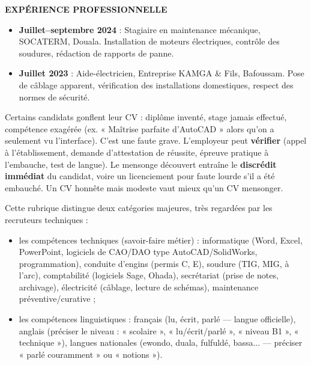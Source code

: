 \documentclass[11pt]{article}
\newcommand{\cle}[1]{{\popxbold\color{popdark}#1}}
\newcounter{popsec}
\newcounter{popsub}
\newcommand{\courssub}[1]{%
  \stepcounter{popsub}%
  \par\vspace{9pt}\noindent{\popxbold\fontsize{11.5}{13}\selectfont\color{popink}{\color{poporange}\thepopsec.\thepopsub}\hspace{6pt}#1}\par\nopagebreak\vspace{4pt}
}
\begin{document}
\begin{exemplebox}
\textbf{EXPÉRIENCE PROFESSIONNELLE}\par
\begin{itemize}
\item \textbf{Juillet--septembre 2024} : Stagiaire en maintenance mécanique, SOCATERM, Douala. Installation de moteurs électriques, contrôle des soudures, rédaction de rapports de panne.
\item \textbf{Juillet 2023} : Aide-électricien, Entreprise KAMGA \& Fils, Bafoussam. Pose de câblage apparent, vérification des installations domestiques, respect des normes de sécurité.
\end{itemize}
\end{exemplebox}

\begin{attention}
Certains candidats gonflent leur CV : diplôme inventé, stage jamais effectué, compétence exagérée (ex. « Maîtrise parfaite d'AutoCAD » alors qu'on a seulement vu l'interface). C'est une faute grave. L'employeur peut \textbf{vérifier} (appel à l'établissement, demande d'attestation de réussite, épreuve pratique à l'embauche, test de langue). Le mensonge découvert entraîne le \textbf{discrédit immédiat} du candidat, voire un licenciement pour faute lourde s'il a été embauché. Un CV honnête mais modeste vaut mieux qu'un CV mensonger.
\end{attention}

\courssub{Les compétences}

Cette rubrique distingue deux catégories majeures, très regardées par les recruteurs techniques :

\begin{itemize}
\item les \cle{compétences techniques} (savoir-faire métier) : informatique (Word, Excel, PowerPoint, logiciels de CAO/DAO type AutoCAD/SolidWorks, programmation), conduite d'engins (permis C, E), soudure (TIG, MIG, à l'arc), comptabilité (logiciels Sage, Ohada), secrétariat (prise de notes, archivage), électricité (câblage, lecture de schémas), maintenance préventive/curative ;
\item les \cle{compétences linguistiques} : français (lu, écrit, parlé — langue officielle), anglais (préciser le niveau : « scolaire », « lu/écrit/parlé », « niveau B1 », « technique »), langues nationales (ewondo, duala, fulfuldé, bassa... — préciser « parlé couramment » ou « notions »).
\end{itemize}
\end{document}
